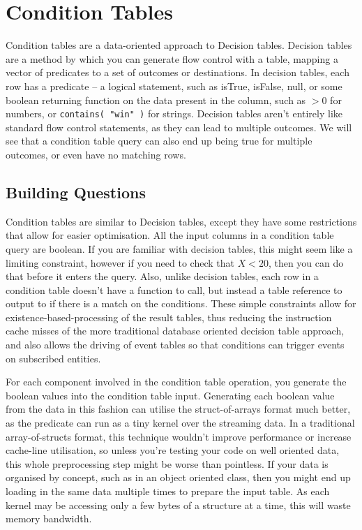 \chapter{Condition Tables}\label{chap:condition}

Condition tables are a data-oriented approach to Decision tables. Decision
tables are a method by which you can generate flow control with a table,
mapping a vector of predicates to a set of outcomes or destinations. In
decision tables, each row has a predicate -- a logical statement, such as
isTrue, isFalse, null, or some boolean returning function on the data present
in the column, such as $>0$ for numbers, or {\tt contains( "win" )} for strings.
Decision tables aren't entirely like standard flow control statements, as they
can lead to multiple outcomes. We will see that a condition table query can
also end up being true for multiple outcomes, or even have no matching rows.

\section{Building Questions}

Condition tables are similar to Decision tables, except they have some
restrictions that allow for easier optimisation. All the input columns in a
condition table query are boolean. If you are familiar with decision tables,
this might seem like a limiting constraint, however if you need to check that $X
< 20$, then you can do that before it enters the query. Also, unlike decision
tables, each row in a condition table doesn't have a function to call, but
instead a table reference to output to if there is a match on the conditions.
These simple constraints allow for existence-based-processing of the result
tables, thus reducing the instruction cache misses of the more traditional
database oriented decision table approach, and also allows the driving of event
tables so that conditions can trigger events on subscribed entities.

For each component involved in the condition table operation, you generate the
boolean values into the condition table input. Generating each boolean value
from the data in this fashion can utilise the struct-of-arrays format much
better, as the predicate can run as a tiny kernel over the streaming data. In a
traditional array-of-structs format, this technique wouldn't improve
performance or increase cache-line utilisation, so unless you're testing your
code on well oriented data, this whole preprocessing step might be worse than
pointless. If your data is organised by concept, such as in an object oriented
class, then you might end up loading in the same data multiple times to prepare
the input table. As each kernel may be accessing only a few bytes of a structure
at a time, this will waste memory bandwidth.

